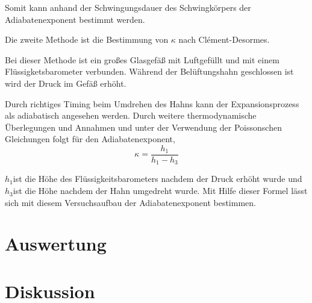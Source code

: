 Somit kann anhand der Schwingungsdauer des Schwingkörpers der Adiabatenexponent
bestimmt werden.

Die zweite Methode ist die Bestimmung von $\kappa$ nach Clément-Desormes.

Bei dieser Methode ist ein großes Glasgefäß mit Luftgefüllt und mit
einem Flüssigketsbarometer verbunden. Während der Belüftungshahn geschlossen
ist wird der Druck im Gefäß erhöht.

Durch richtiges Timing beim Umdrehen des Hahns kann der Expansionsprozess
als adiabatisch angesehen werden. Durch weitere thermodynamische Überlegungen
und Annahmen und unter der Verwendung der Poissonschen Gleichungen
folgt für den Adiabatenexponent,
\begin{equation}
\kappa=\frac{h_{1}}{h_{1}-h_{3}}\label{eq:adiabatenexponent2}
\end{equation}


$h_{1}$ist die Höhe des Flüssigkeitsbarometers nachdem der Druck
erhöht wurde und $h_{3}$ist die Höhe nachdem der Hahn umgedreht wurde.
Mit Hilfe dieser Formel lässt sich mit diesem Versuchsaufbau der Adiabatenexponent
bestimmen.
\newpage
\section{Auswertung}

\newpage
\section{Diskussion} 
